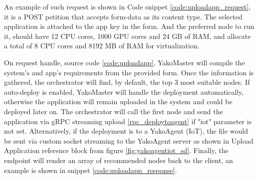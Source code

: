                 An example of such request is shown in Code snippet \ref{code:uploadapp_request}, it is a POST petition that accepts form-data as its content type. The selected application is attached to the app key in the form. And the preferred node to run it, should have 12 CPU cores, 1000 GPU cores and 24 GB of RAM, and allocate a total of 8 CPU cores and 8192 MB of RAM for virtualization.
            
                
                On request handle, source code \ref{code:uploadapp}, YakoMaster will compile the system's and app's requirements from the provided form. Once the information is gathered, the orchestrator will find, by default, the top 3 most suitable nodes. If auto-deploy is enabled, YakoMaster will handle the deployment automatically, otherwise the application will remain uploaded in the system and could be deployed later on. The orchestrator will call the first node and send the application via gRPC streaming upload \ref{rpc_deploytoagent} if "iot" parameter is not set. Alternatively, if the deployment is to a YakoAgent (IoT), the file would be sent via custom socket streaming to the YakoAgent server as shown in Upload Application reference block from figure \ref{fig:yakoagentiot_sd}. Finally, the endpoint will render an array of recommended nodes back to the client, an example is shown in snippet \ref{code:uploadapp_response}.
                
            
